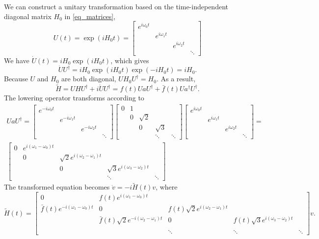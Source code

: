 \documentclass[11pt]{article}
\begin{document}
We can construct a unitary transformation based
on the time-independent diagonal matrix $H_0$ in \eqref{eq_matrices},
\[
U(t) = \exp(i H_0 t)=
\begin{bmatrix}
e^{i\omega_0t} & & &\\
& e^{i\omega_1 t} &&\\
& & e^{i\omega_2 t} &\\
& & & \ddots
\end{bmatrix}
\]
We have $\dot{U}(t) = i H_0 \exp(i H_0 t)$, which gives
\[
\dot{U}U^\dag =  i H_0 \exp(i H_0 t) \exp(- i H_0 t) = i H_0.
\]
Because $U$ and $H_0$ are both diagonal, $UH_0U^\dag = H_0$. As a result,
\[
\tilde{H} = U H U^\dag + i \dot{U}U^\dag = f(t) UaU^\dag + \bar{f}(t) Ua^\dag U^\dag.
\]
The lowering operator transforms according to
\begin{multline*}
UaU^\dag =
\begin{bmatrix}
  e^{-i\omega_0t} & & & \\
  & e^{-i\omega_1 t} & & \\
  & &  e^{-i\omega_2 t} & \\
  & & & \ddots
\end{bmatrix}
\begin{bmatrix}
0 & 1 & & &\\
 & 0 & \sqrt{2} & &\\
&  & 0 & \sqrt{3} &\\
& &  & \ddots & \ddots
\end{bmatrix}
\begin{bmatrix}
  e^{i\omega_0t} & & & \\
  & e^{i\omega_1 t} & & \\
  & &  e^{i\omega_2 t} & \\
  & & & \ddots
\end{bmatrix} = \\
%
\begin{bmatrix}
0 & e^{i(\omega_1 - \omega_0)t} & & &\\
 & 0 & \sqrt{2} e^{i(\omega_2 -\omega_1) t}& &\\
&  & 0 & \sqrt{3} e^{i(\omega_3 -\omega_2)t}  &\\
& &  & \ddots & \ddots
\end{bmatrix}
%
\end{multline*}
The transformed equation becomes $\dot{v} = -i\tilde{H}(t)v$, where
\[
\tilde{H}(t) = \begin{bmatrix}
0 & f(t) e^{i(\omega_1 - \omega_0)t} & & &\\
\bar{f}(t) e^{-i(\omega_1 - \omega_0)t} & 0 & f(t) \sqrt{2} e^{i(\omega_2 -\omega_1) t}& &\\
& \bar{f}(t) \sqrt{2} e^{-i(\omega_2 -\omega_1) t} & 0 & f(t) \sqrt{3} e^{i(\omega_3 -\omega_2)t}
&\\
\\
& & \ddots & \ddots & \ddots
\end{bmatrix}v.
\]
\end{document}
